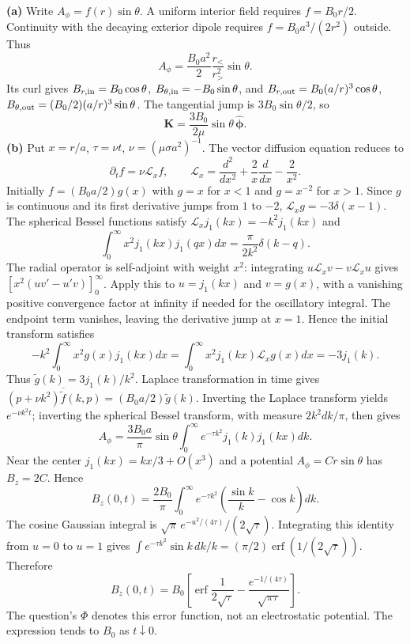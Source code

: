 \solution
\textbf{(a)} Write $A_\phi=f(r)\sin\theta$.
A uniform interior field requires $f=B_0r/2$.
Continuity with the decaying exterior dipole requires
$f=B_0a^3/(2r^2)$ outside. Thus
\[
\boxed{A_\phi=\frac{B_0a^2}{2}\frac{r_<}{r_>^2}\sin\theta.}
\]
Its curl gives $B_{r,\rm in}=B_0\cos\theta$,
$B_{\theta,\rm in}=-B_0\sin\theta$, and
$B_{r,\rm out}=B_0(a/r)^3\cos\theta$,
$B_{\theta,\rm out}=(B_0/2)(a/r)^3\sin\theta$.
The tangential jump is $3B_0\sin\theta/2$, so
\[
\boxed{\mathbf K=\frac{3B_0}{2\mu}\sin\theta\,\widehat{\boldsymbol\phi}.}
\]
\textbf{(b)} Put $x=r/a$, $\tau=\nu t$, $\nu=(\mu\sigma a^2)^{-1}$.
The vector diffusion equation reduces to
\[
\partial_tf=\nu\mathcal L_xf,\qquad
\mathcal L_x=\frac{d^2}{dx^2}+\frac2x\frac d{dx}-\frac2{x^2}.
\]
Initially $f=(B_0a/2)g(x)$ with $g=x$ for $x<1$ and $g=x^{-2}$
for $x>1$. Since $g$ is continuous and its first derivative jumps
from $1$ to $-2$, $\mathcal L_xg=-3\delta(x-1)$.
The spherical Bessel functions satisfy
$\mathcal L_xj_1(kx)=-k^2j_1(kx)$ and
\[
\int_0^\infty x^2j_1(kx)j_1(qx)dx
=\frac{\pi}{2k^2}\delta(k-q).
\]
The radial operator is self-adjoint with weight $x^2$: integrating
$u\mathcal L_xv-v\mathcal L_xu$ gives
$[x^2(uv'-u'v)]_0^\infty$. Apply this to $u=j_1(kx)$ and $v=g(x)$,
with a vanishing positive convergence factor at infinity if needed for
the oscillatory integral. The endpoint term vanishes, leaving the
derivative jump at $x=1$. Hence the initial transform satisfies
\[
-k^2\int_0^\infty x^2g(x)j_1(kx)dx
=\int_0^\infty x^2j_1(kx)\mathcal L_xg(x)dx=-3j_1(k).
\]
Thus $\widetilde g(k)=3j_1(k)/k^2$.
Laplace transformation in time gives
$(p+\nu k^2)\overline{\widetilde f}(k,p)
=(B_0a/2)\widetilde g(k)$.
Inverting the Laplace transform yields $e^{-\nu k^2t}$;
inverting the spherical Bessel transform, with measure $2k^2dk/\pi$,
then gives
\[
\boxed{A_\phi=\frac{3B_0a}{\pi}\sin\theta
\int_0^\infty e^{-\tau k^2}j_1(k)j_1(kx)dk.}
\]
Near the center $j_1(kx)=kx/3+O(x^3)$ and a potential
$A_\phi=Cr\sin\theta$ has $B_z=2C$. Hence
\[
B_z(0,t)=\frac{2B_0}{\pi}\int_0^\infty e^{-\tau k^2}
\left(\frac{\sin k}{k}-\cos k\right)dk.
\]
The cosine Gaussian integral is
$\sqrt\pi\,e^{-u^2/(4\tau)}/(2\sqrt\tau)$.
Integrating this identity from $u=0$ to $u=1$ gives
$\int e^{-\tau k^2}\sin k\,dk/k=(\pi/2)\operatorname{erf}(1/(2\sqrt\tau))$.
Therefore
\[
\boxed{B_z(0,t)=B_0\left[
\operatorname{erf}\frac1{2\sqrt\tau}
-\frac{e^{-1/(4\tau)}}{\sqrt{\pi\tau}}\right].}
\]
The question's $\Phi$ denotes this error function, not an electrostatic
potential. The expression tends to $B_0$ as $t\downarrow0$.

